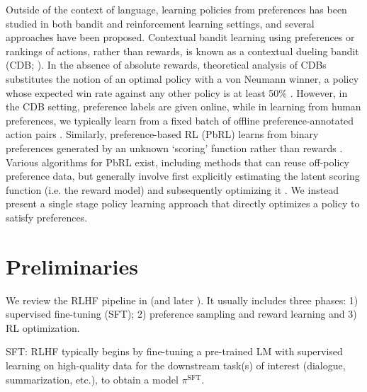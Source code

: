 \documentclass{article}
\begin{document}
Outside of the context of language, learning policies from preferences has been studied in both bandit and reinforcement learning settings, and several approaches have been proposed. Contextual bandit learning using preferences or rankings of actions, rather than rewards, is known as a contextual dueling bandit (CDB; \cite{yue2012karmed,dudik2015contextual}). In the absence of absolute rewards, theoretical analysis of CDBs substitutes the notion of an optimal policy with a von Neumann winner, a policy whose expected win rate against any other policy is at least 50\% \citep{dudik2015contextual}. However, in the CDB setting, preference labels are given online, while in learning from human preferences, we typically learn from a fixed batch of offline preference-annotated action pairs \citep{yan2022human}. Similarly, preference-based RL (PbRL) learns from binary preferences generated by an unknown `scoring' function rather than rewards \citep{BusaFekete2014,ruiz2023dueling}. Various algorithms for PbRL exist, including methods that can reuse off-policy preference data, but generally involve first explicitly estimating the latent scoring function (i.e. the reward model) and subsequently optimizing it \citep{jain2013learning,BusaFekete2014,christiano2017deep,sadigh2017active,kupcsik2018learning}. We instead present a single stage policy learning approach that directly optimizes a policy to satisfy preferences.

\section{Preliminaries}\label{section:prelims}

We review the RLHF pipeline in \citeauthor{ziegler2020finetuning} (and later \citep{stiennon2022learning, bai2022training, ouyang2022training}). It usually includes three phases: 1) supervised fine-tuning (SFT); 2) preference sampling and reward learning and 3) RL optimization.

SFT: RLHF typically begins by fine-tuning a pre-trained LM with supervised learning on high-quality data for the downstream task(s) of interest (dialogue, summarization, etc.), to obtain a model $\pi^\text{SFT}$.
\end{document}
